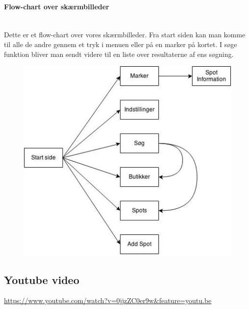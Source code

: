 \documentclass[12pt]{article}
\begin{document}
\newpage
\paragraph{Flow-chart over skærmbilleder}\mbox{}\\
Dette er et flow-chart over vores skærmbilleder. Fra start siden kan man komme til alle de andre gennem et tryk i menuen eller på en marker på kortet. I søge funktion bliver man sendt videre til en liste over resultaterne af ens søgning.
\begin{figure}[h]
\includegraphics[scale = 0.8]{flowDiagram}
\end{figure}
\newpage
\subsection*{Youtube video}
\url{https://www.youtube.com/watch?v=0jjzZC0er9w&feature=youtu.be}
\end{document}
